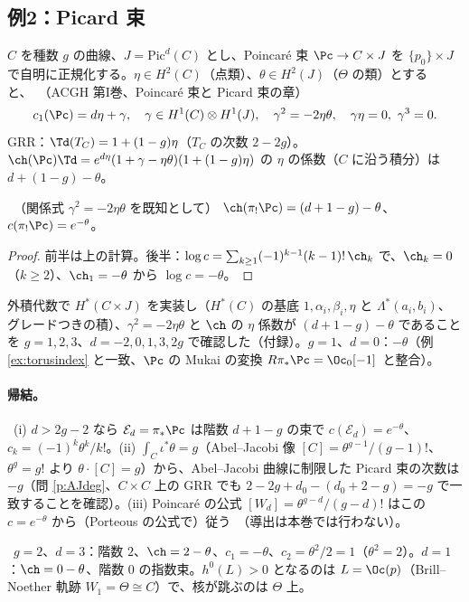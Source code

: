 \subsection{例2：Picard 束}\label{sec:Picard}
$C$ を種数 $g$ の曲線、$J=\mathrm{Pic}^d(C)$ とし、Poincaré 束 $\Pc\to C\times J$ を $\{p_0\}\times J$ で自明に正規化する。$\eta\in H^2(C)$（点類）、$\theta\in H^2(J)$（$\Theta$ の類）とすると、\tC\ （ACGH 第I巻、Poincaré 束と Picard 束の章\tQ{}）
\[
c_1(\Pc)=d\eta+\gamma,\quad\gamma\in H^1(C)\otimes H^1(J),\quad\gamma^2=-2\eta\theta,\quad\gamma\eta=0,\ \gamma^3=0.
\]
GRR：$\Td(T_C)=1+(1-g)\eta$（$T_C$ の次数 $2-2g$）。$\ch(\Pc)\Td=e^{d\eta}(1+\gamma-\eta\theta)(1+(1-g)\eta)$ の $\eta$ の係数（$C$ に沿う積分）は $d+(1-g)-\theta$。
\begin{thm}\label{thm:Picard}\tP\ （関係式 $\gamma^2=-2\eta\theta$ を既知として）
$\ch(\pi_!\Pc)=(d+1-g)-\theta$、$c(\pi_!\Pc)=e^{-\theta}$。
\end{thm}
\begin{proof}
前半は上の計算。後半：$\log c=\sum_{k\ge1}(-1)^{k-1}(k-1)!\,\ch_k$ で、$\ch_k=0$（$k\ge2$）、$\ch_1=-\theta$ から $\log c=-\theta$。
\end{proof}
外積代数で $H^*(C\times J)$ を実装し（$H^*(C)$ の基底 $1,\alpha_i,\beta_i,\eta$ と $\Lambda^*(a_i,b_i)$、グレードつきの積）、$\gamma^2=-2\eta\theta$ と $\ch$ の $\eta$ 係数が $(d+1-g)-\theta$ であることを $g=1,2,3$、$d=-2,0,1,3,2g$ で確認した（付録）。$g=1$、$d=0$：$-\theta$（例 \ref{ex:torusindex} と一致、$\Pc$ の Mukai の変換 $R\pi_*\Pc=\Oc_0[-1]$\tQ\ と整合）。
\paragraph{帰結。}\tC\ (i) $d>2g-2$ なら $\mathcal E_d=\pi_*\Pc$ は階数 $d+1-g$ の束で $c(\mathcal E_d)=e^{-\theta}$、$c_k=(-1)^k\theta^k/k!$。(ii) $\int_C\iota^*\theta=g$（Abel--Jacobi 像 $[C]=\theta^{g-1}/(g-1)!$、$\theta^g=g!$ より $\theta\cdot[C]=g$）から、Abel--Jacobi 曲線に制限した Picard 束の次数は $-g$（問 \ref{p:AJdeg}、$C\times C$ 上の GRR でも $2-2g+d_0-(d_0+2-g)=-g$ で一致することを確認）。(iii) Poincaré の公式 $[W_d]=\theta^{g-d}/(g-d)!$ はこの $c=e^{-\theta}$ から（Porteous の公式で）従う\tC\ （導出は本巻では行わない）。
\begin{ex}\label{ex:g2}\tP\
$g=2$、$d=3$：階数 $2$、$\ch=2-\theta$、$c_1=-\theta$、$c_2=\theta^2/2=1$（$\theta^2=2$）。$d=1$：$\ch=0-\theta$、階数 $0$ の指数束。$h^0(L)>0$ となるのは $L=\Oc(p)$（Brill--Noether 軌跡 $W_1=\Theta\cong C$）で、核が跳ぶのは $\Theta$ 上。
\end{ex}

